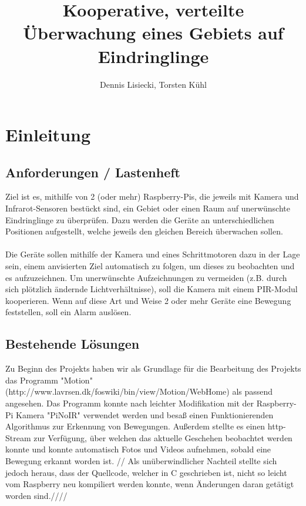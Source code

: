 \documentclass[12pt,a4paper]{scrreprt}
\title{Kooperative, verteilte Überwachung eines Gebiets auf Eindringlinge}
\author{Dennis Lisiecki, Torsten Kühl}
\begin{document}
\maketitle	%
\tableofcontents	%

\chapter{Einleitung}
\section{Anforderungen / Lastenheft}
Ziel ist es, mithilfe von 2 (oder mehr) Raspberry-Pis, die jeweils mit Kamera und Infrarot-Sensoren bestückt sind, ein Gebiet oder einen Raum auf unerwünschte Eindringlinge zu überprüfen. 
Dazu werden die Geräte an unterschiedlichen Positionen aufgestellt, welche jeweils den gleichen Bereich überwachen sollen. 
\\
\\
Die Geräte sollen mithilfe der Kamera und eines Schrittmotoren dazu in der Lage sein, einem anvisierten Ziel automatisch zu folgen, um dieses zu beobachten und es aufzuzeichnen. Um unerwünschte Aufzeichnungen zu vermeiden (z.B. durch sich plötzlich ändernde Lichtverhältnisse), soll die Kamera mit einem PIR-Modul kooperieren.
Wenn auf diese Art und Weise 2 oder mehr Geräte eine Bewegung feststellen, soll ein Alarm auslösen.



\section{Bestehende Lösungen}

Zu Beginn des Projekts haben wir als Grundlage für die Bearbeitung des Projekts das Programm "Motion" (http://www.lavrsen.dk/foswiki/bin/view/Motion/WebHome) als passend angesehen. Das Programm konnte nach leichter Modifikation mit der Raspberry-Pi Kamera "PiNoIR" verwendet werden und besaß einen Funktionierenden Algorithmus zur Erkennung von Bewegungen. Außerdem stellte es einen http-Stream zur Verfügung, über welchen das aktuelle Geschehen beobachtet werden konnte und konnte automatisch Fotos und Videos aufnehmen, sobald eine Bewegung erkannt worden ist.
//
Als unüberwindlicher Nachteil stellte sich jedoch heraus, dass der Quellcode, welcher in C geschrieben ist, nicht so leicht vom Raspberry neu kompiliert werden konnte, wenn Änderungen daran getätigt worden sind.////
\end{document}
